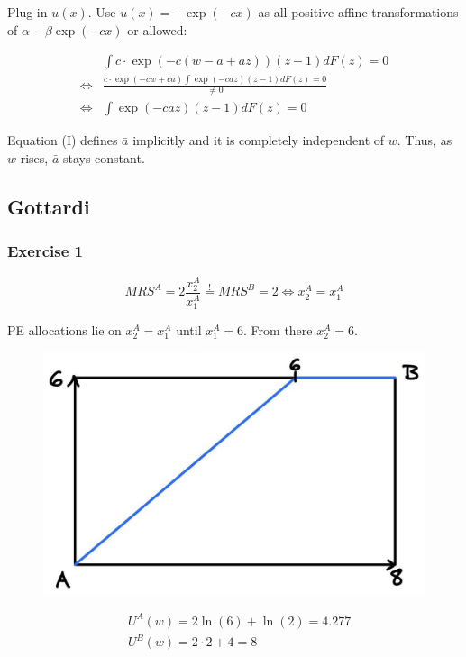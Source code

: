 {\begin{enumerate}[label=(\alph*)]
{Plug in $u(x)$. Use $u(x)=-\exp (-c x)$ as all positive affine transformations of $\alpha-\beta \exp (-c x)$ or allowed:

\begin{align*}
    & \int c \cdot \exp (-c(w-a+a z))(z-1) d F(z)=0 \\
    \Leftrightarrow & \frac{c \cdot \exp (-c w+c a) \int \exp (-c a z)(z-1) d F(z)=0}{\neq 0} \\
    \Leftrightarrow & \int \exp (-c a z)(z-1) d F(z)=0 \quad \tag{I}
\end{align*}

Equation (I) defines $\bar{a}$ implicitly and it is completely independent of $w$. Thus, as $w$ rises, $\bar{a}$ stays constant.
}
\end{enumerate}
}

\newpage
{
\subsection*{Gottardi}

\subsubsection*{Exercise 1}

\begin{enumerate}[label=(\alph*)]
{\item 

$$
M R S^{A}=2 \frac{x_{2}^{A}}{x_{1}^{A}} \stackrel{!}{=} M R S^{B}=2 \Leftrightarrow x_{2}^{A}=x_{1}^{A}
$$

PE allocations lie on $x_{2}^{A}=x_{1}^{A}$ until $x_{1}^{A}=6$. From there $x_{2}^{A}=6$.

\begin{figure}[!htp]
    \centering
    \includegraphics[width=.75\textwidth]{images/2016_17_2_1.png}
\end{figure}
}
{\item 
$$
\begin{aligned}
& U^{A}(w)=2 \ln (6)+\ln (2)=4.277 \\
& U^{B}(w)=2 \cdot 2+4=8
\end{aligned}
$$

}
\end{enumerate}}
